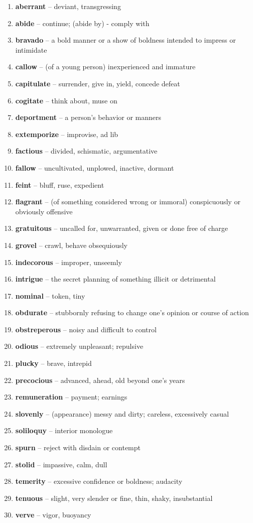 \begin{enumerate}[wide,labelindent=0pt]
\item \textbf{aberrant} -- deviant, transgressing
\item \textbf{abide} -- continue; (abide by) - comply with
\item \textbf{bravado} -- a bold manner or a show of boldness intended to impress or intimidate
\item \textbf{callow} -- (of a young person) inexperienced and immature
\item \textbf{capitulate} -- surrender, give in, yield, concede defeat
\item \textbf{cogitate} -- think about, muse on
\item \textbf{deportment} -- a person's behavior or manners
\item \textbf{extemporize} -- improvise, ad lib
\item \textbf{factious} -- divided, schismatic, argumentative
\item \textbf{fallow} -- uncultivated, unplowed, inactive, dormant
\item \textbf{feint} -- bluff, ruse, expedient
\item \textbf{flagrant} -- (of something considered wrong or immoral) conspicuously or obviously offensive
\item \textbf{gratuitous} -- uncalled for, unwarranted, given or done free of charge
\item \textbf{grovel} -- crawl, behave obsequiously
\item \textbf{indecorous} -- improper, unseemly
\item \textbf{intrigue} -- the secret planning of something illicit or detrimental
\item \textbf{nominal} -- token, tiny
\item \textbf{obdurate} -- stubbornly refusing to change one's opinion or course of action
\item \textbf{obstreperous} -- noisy and difficult to control
\item \textbf{odious} -- extremely unpleasant; repulsive
\item \textbf{plucky} -- brave, intrepid
\item \textbf{precocious} -- advanced, ahead, old beyond one's years
\item \textbf{remuneration} -- payment; earnings
\item \textbf{slovenly} -- (appearance) messy and dirty; careless, excessively casual
\item \textbf{soliloquy} -- interior monologue
\item \textbf{spurn} -- reject with disdain or contempt
\item \textbf{stolid} -- impassive, calm, dull
\item \textbf{temerity} -- excessive confidence or boldness; audacity
\item \textbf{tenuous} -- slight, very slender or fine, thin, shaky, insubstantial
\item \textbf{verve} -- vigor, buoyancy

\end{enumerate}

